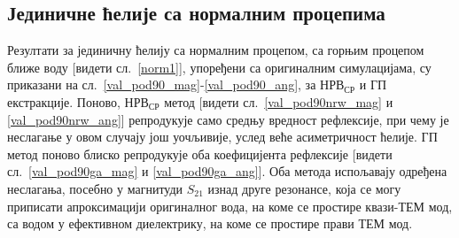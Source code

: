 \subsection{Јединичне ћелије са нормалним процепима}
Резултати за јединичну ћелију са нормалним процепом, са горњим процепом ближе воду [видети сл.~\ref{norm1}], упоређени са оригиналним симулацијама, су приказани на сл.~\ref{val_pod90_mag}-\ref{val_pod90_ang}, за $НРВ_{СР}$ и ГП екстракције. Поново, $НРВ_{СР}$ метод [видети сл.~\ref{val_pod90nrw_mag} и \ref{val_pod90nrw_ang}] репродукује само средњу вредност рефлексије, при чему је неслагање у овом случају још уочљивије, услед веће асиметричност ћелије. ГП метод поново блиско репродукује оба коефицијента рефлексије [видети сл.~\ref{val_pod90ga_mag} и \ref{val_pod90ga_ang}]. Оба метода испољавају одређена неслагања, посебно у магнитуди $S_{21}$ изнад друге резонансе, која се могу приписати апроксимацији оригиналног вода, на коме се простире квази-ТЕМ мод, са водом у ефективном диелектрику, на коме се простире прави ТЕМ мод.
